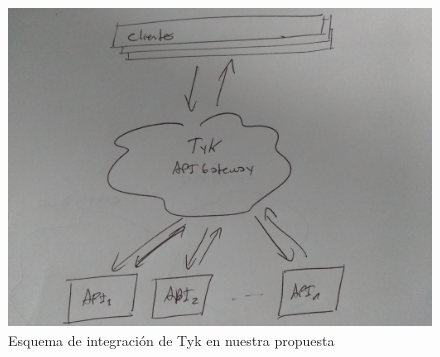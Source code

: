 \begin{figure}[H]
  \includegraphics[width=\linewidth]{src/images/03-capitulo-3/tecnologias/tyk/tyk-arq.jpg}
  \caption{Esquema de integración de Tyk en nuestra propuesta}
  \label{fig:integracion-tyk-arquitectura}
\end{figure}
